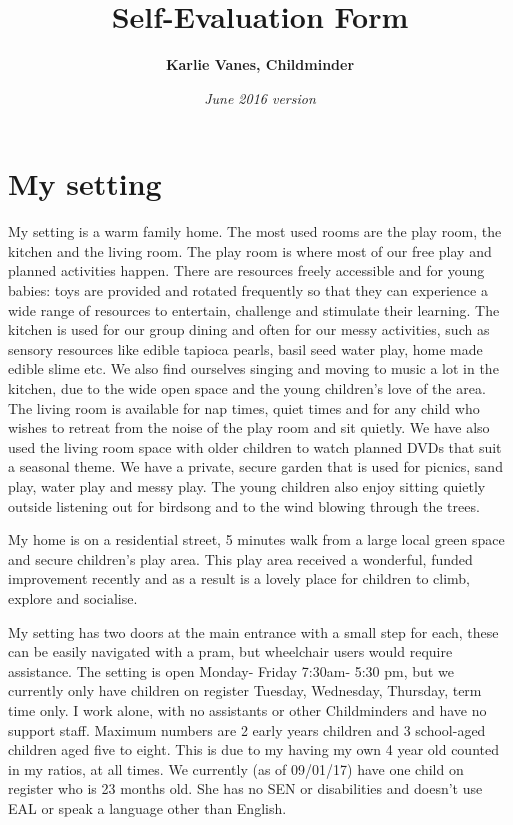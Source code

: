 \documentclass[10pt,a4paper]{report}
\title{\huge\bfseries\sffamily\color{MSBlue}Self-Evaluation Form}
\author{\Large\bfseries\sffamily\color{MSLightBlue}Karlie Vanes, Childminder}
\date{\itshape\subsectionfont June 2016 version}
\begin{document}
\maketitle

\tableofcontents

\chapter{My setting}

My setting is a warm family home. The most used rooms are the play room, the kitchen and the living room. The play room is where most of our free play and planned activities happen. There are  resources freely accessible and for young babies: toys are provided and rotated frequently so that they can experience a wide range of resources to entertain, challenge and stimulate their learning. The kitchen is used for our group dining and often for our messy activities, such as sensory resources like edible tapioca pearls, basil seed water play, home made edible slime etc. We also find ourselves singing and moving to music a lot in the kitchen, due to the wide open space and the young children's love of the area. The living room is available for nap times, quiet times and for any child who wishes to retreat from the noise of the play room and sit quietly. We have also used the living room space with older children to watch planned DVDs that suit a seasonal theme. We have a private, secure garden that is used for picnics, sand play, water play and messy play. The young children also enjoy sitting quietly outside listening out for birdsong and to the wind blowing through the trees. 

My home is on a residential street, 5 minutes walk from a large local green space and secure children's play area. This play area received a wonderful, funded improvement recently and as a result is a lovely place for children to climb, explore and socialise. 

My setting has two doors at the main entrance with a small step for each, these can be easily navigated with a pram, but wheelchair users would require assistance. The setting is open Monday- Friday 7:30am- 5:30 pm, but we currently only have children on register Tuesday, Wednesday, Thursday, term time only. I work alone, with no assistants or other Childminders and have no support staff. Maximum numbers are 2 early years children and 3 school-aged children aged five to eight. This is due to my having my own 4 year old counted in my ratios, at all times. We currently (as of 09/01/17) have one child on register who is 23 months old. She has no SEN or disabilities and doesn't use EAL or speak a language other than English. 
\end{document}
